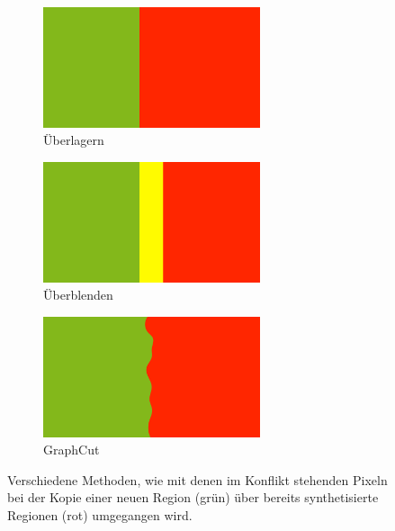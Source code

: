 \begin{figure}
	\centering
	\begin{subfigure}{0.3\textwidth}
		\centering
		\includegraphics[width=0.7\textwidth]{images/patchbased-overlay}
		\caption{Überlagern}
	\end{subfigure}
	\hfill
	\begin{subfigure}{0.3\textwidth}
		\centering
		\includegraphics[width=0.7\textwidth]{images/patchbased-blending}
		\caption{Überblenden}
	\end{subfigure}
	\hfill
	\begin{subfigure}{0.3\textwidth}
		\centering
		\includegraphics[width=0.7\textwidth]{images/patchbased-graphcut}
		\caption{GraphCut}
	\end{subfigure}
	
	\caption{
		Verschiedene Methoden, wie mit denen im Konflikt stehenden Pixeln bei der Kopie einer neuen Region (grün) über bereits synthetisierte Regionen (rot) umgegangen wird.
	}
	\label{regionsbasiert}
\end{figure}

